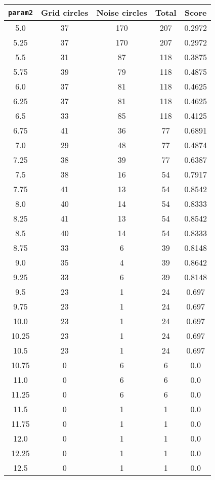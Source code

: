 \documentclass[letterpaper, 12pt]{article}
\begin{document}
\begin{longtable}{|c|c|c|c|c|}
\hline
\textbf{\texttt{param2}} & \textbf{Grid circles} & \textbf{Noise circles} & \textbf{Total} & \textbf{Score} \\
\hline
5.0 & 37 & 170 & 207 & 0.2972 \\
\hline
5.25 & 37 & 170 & 207 & 0.2972 \\
\hline
5.5 & 31 & 87 & 118 & 0.3875 \\
\hline
5.75 & 39 & 79 & 118 & 0.4875 \\
\hline
6.0 & 37 & 81 & 118 & 0.4625 \\
\hline
6.25 & 37 & 81 & 118 & 0.4625 \\
\hline
6.5 & 33 & 85 & 118 & 0.4125 \\
\hline
6.75 & 41 & 36 & 77 & 0.6891 \\
\hline
7.0 & 29 & 48 & 77 & 0.4874 \\
\hline
7.25 & 38 & 39 & 77 & 0.6387 \\
\hline
7.5 & 38 & 16 & 54 & 0.7917 \\
\hline
7.75 & 41 & 13 & 54 & 0.8542 \\
\hline
8.0 & 40 & 14 & 54 & 0.8333 \\
\hline
8.25 & 41 & 13 & 54 & 0.8542 \\
\hline
8.5 & 40 & 14 & 54 & 0.8333 \\
\hline
8.75 & 33 & 6 & 39 & 0.8148 \\
\hline
9.0 & 35 & 4 & 39 & 0.8642 \\
\hline
9.25 & 33 & 6 & 39 & 0.8148 \\
\hline
9.5 & 23 & 1 & 24 & 0.697 \\
\hline
9.75 & 23 & 1 & 24 & 0.697 \\
\hline
10.0 & 23 & 1 & 24 & 0.697 \\
\hline
10.25 & 23 & 1 & 24 & 0.697 \\
\hline
10.5 & 23 & 1 & 24 & 0.697 \\
\hline
10.75 & 0 & 6 & 6 & 0.0 \\
\hline
11.0 & 0 & 6 & 6 & 0.0 \\
\hline
11.25 & 0 & 6 & 6 & 0.0 \\
\hline
11.5 & 0 & 1 & 1 & 0.0 \\
\hline
11.75 & 0 & 1 & 1 & 0.0 \\
\hline
12.0 & 0 & 1 & 1 & 0.0 \\
\hline
12.25 & 0 & 1 & 1 & 0.0 \\
\hline
12.5 & 0 & 1 & 1 & 0.0 \\

\end{longtable}
\end{document}
